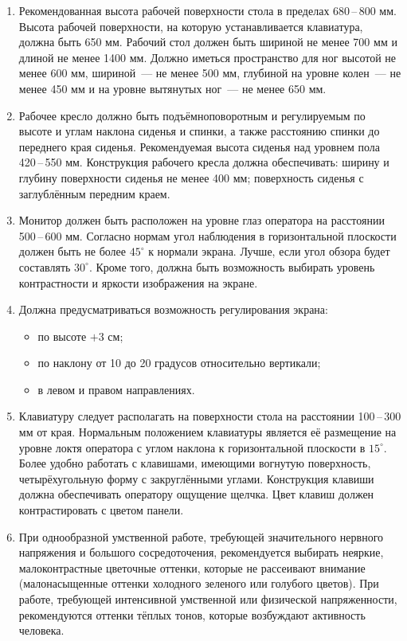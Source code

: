 \begin{enumerate}
[leftmargin=0pt,itemindent=\parindent+\labelwidth+\labelsep]
    \item Рекомендованная высота рабочей поверхности стола в пределах 680\,--\,800 мм. 
    Высота рабочей поверхности, на которую устанавливается клавиатура, должна быть 650 мм. 
    Рабочий стол должен быть шириной не менее 700 мм и длиной не менее 1400 мм. 
    Должно иметься пространство для ног высотой не менее 600 мм, шириной~--- не менее 500 мм, глубиной на уровне колен~--- не менее 450 мм и на уровне вытянутых ног~--- не менее 650 мм.
    \item Рабочее кресло должно быть подъёмно\-поворотным и регулируемым по высоте и углам наклона сиденья и спинки, а также расстоянию спинки до переднего края сиденья. 
    Рекомендуемая высота сиденья над уровнем пола 420\,--\,550 мм. 
    Конструкция рабочего кресла должна обеспечивать: ширину и глубину поверхности сиденья не менее 400 мм; поверхность сиденья с заглублённым передним краем.
    \item Монитор должен быть расположен на уровне глаз оператора на расстоянии 500\,--\,600 мм. 
    Согласно нормам угол наблюдения в горизонтальной плоскости должен быть не более $45^\circ$ к нормали экрана.
    Лучше, если угол обзора будет составлять $30^\circ$. 
    Кроме того, должна быть возможность выбирать уровень контрастности и яркости изображения на экране.
    \item Должна предусматриваться возможность регулирования экрана:
    \begin{itemize}[leftmargin=\leftmargin++]
        \item по высоте $+3$ см;
        \item по наклону от 10 до 20 градусов относительно вертикали;
        \item в левом и правом направлениях.
    \end{itemize}
    \item Клавиатуру следует располагать на поверхности стола на расстоянии 100\,--\,300 мм от края. 
    Нормальным положением клавиатуры является её размещение на уровне локтя оператора с углом наклона к горизонтальной плоскости в $15^\circ$. 
    Более удобно работать с клавишами, имеющими вогнутую поверхность, четырёхугольную форму с закруглёнными углами.
    Конструкция клавиши должна обеспечивать оператору ощущение щелчка. 
    Цвет клавиш должен контрастировать с цветом панели.
    \item При однообразной умственной работе, требующей значительного нервного напряжения и большого сосредоточения, рекомендуется выбирать неяркие, малоконтрастные цветочные оттенки, которые не рассеивают внимание (малонасыщенные оттенки холодного зеленого или голубого цветов). 
    При работе, требующей интенсивной умственной или физической напряженности, рекомендуются оттенки тёплых тонов, которые возбуждают активность человека. 
\end{enumerate}


